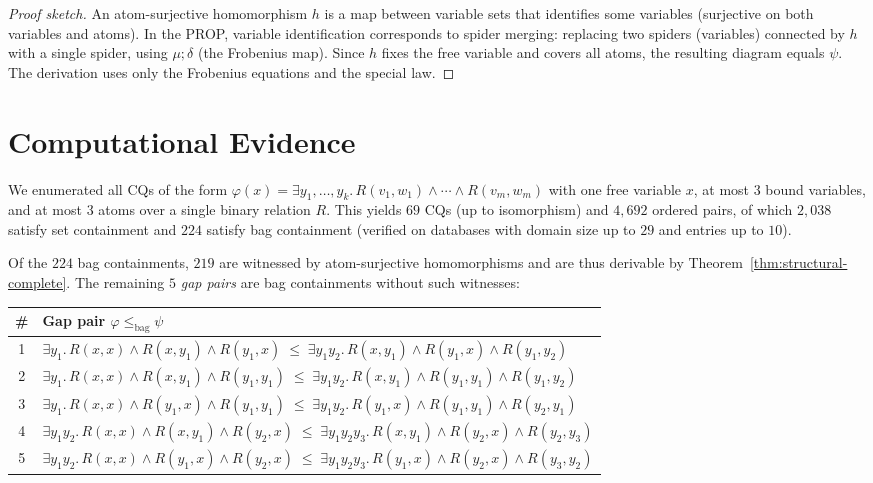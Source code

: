 \documentclass[11pt,a4paper]{article}
\theoremstyle{definition}
\begin{document}
\begin{proof}[Proof sketch]
An atom-surjective homomorphism $h$ is a map between variable sets that identifies some variables (surjective on both variables and atoms). In the PROP, variable identification corresponds to spider merging: replacing two spiders (variables) connected by $h$ with a single spider, using $\mu;\delta$ (the Frobenius map). Since $h$ fixes the free variable and covers all atoms, the resulting diagram equals $\psi$. The derivation uses only the Frobenius equations and the special law.
\end{proof}

\section{Computational Evidence}
\label{sec:evidence}

We enumerated all CQs of the form $\varphi(x) = \exists y_1, \ldots, y_k.\, R(v_1,w_1) \wedge \cdots \wedge R(v_m, w_m)$ with one free variable $x$, at most $3$ bound variables, and at most $3$ atoms over a single binary relation $R$. This yields $69$ CQs (up to isomorphism) and $4{,}692$ ordered pairs, of which $2{,}038$ satisfy set containment and $224$ satisfy bag containment (verified on databases with domain size up to $29$ and entries up to $10$).

Of the $224$ bag containments, $219$ are witnessed by atom-surjective homomorphisms and are thus derivable by Theorem~\ref{thm:structural-complete}. The remaining $5$ \emph{gap pairs} are bag containments without such witnesses:

\begin{center}
\renewcommand{\arraystretch}{1.3}
\begin{tabular}{cl}
\hline
\# & \textbf{Gap pair} $\varphi \leq_{\mathrm{bag}} \psi$ \\
\hline
1 & $\exists y_1.\, R(x,x) \wedge R(x,y_1) \wedge R(y_1,x) \;\leq\; \exists y_1 y_2.\, R(x,y_1) \wedge R(y_1,x) \wedge R(y_1,y_2)$ \\
2 & $\exists y_1.\, R(x,x) \wedge R(x,y_1) \wedge R(y_1,y_1) \;\leq\; \exists y_1 y_2.\, R(x,y_1) \wedge R(y_1,y_1) \wedge R(y_1,y_2)$ \\
3 & $\exists y_1.\, R(x,x) \wedge R(y_1,x) \wedge R(y_1,y_1) \;\leq\; \exists y_1 y_2.\, R(y_1,x) \wedge R(y_1,y_1) \wedge R(y_2,y_1)$ \\
4 & $\exists y_1 y_2.\, R(x,x) \wedge R(x,y_1) \wedge R(y_2,x) \;\leq\; \exists y_1 y_2 y_3.\, R(x,y_1) \wedge R(y_2,x) \wedge R(y_2,y_3)$ \\
5 & $\exists y_1 y_2.\, R(x,x) \wedge R(y_1,x) \wedge R(y_2,x) \;\leq\; \exists y_1 y_2 y_3.\, R(y_1,x) \wedge R(y_2,x) \wedge R(y_3,y_2)$ \\
\hline
\end{tabular}
\end{center}
\end{document}
